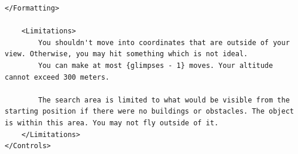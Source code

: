 \begin{lstlisting}[caption=Prompt template for \hardchallenge{}.,label={lst:promptfs2}]
    </Formatting>

    <Limitations>
        You shouldn't move into coordinates that are outside of your view. Otherwise, you may hit something which is not ideal.
        You can make at most {glimpses - 1} moves. Your altitude cannot exceed 300 meters. 
        
        The search area is limited to what would be visible from the starting position if there were no buildings or obstacles. The object is within this area. You may not fly outside of it.
    </Limitations>
</Controls>
\end{lstlisting}